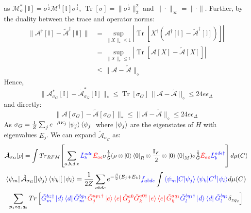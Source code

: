 \documentclass[aps,floatfix,10pt,amssymb,amsfont,amsmath,superscriptaddress,float,nofootinbib,longbibliography,nobalancelastpage,twocolumn]{revtex4-2}
\begin{document}
as $\mathcal{M}^*_{\sigma}[\mathbb{I}] = \sigma^{\frac{1}{2}}\mathcal{M}^{\dagger}[\mathbb{I}]\sigma^{\frac{1}{2}}$, $\operatorname{Tr}[\sigma] = \|\sigma^{\frac{1}{2}}\|_2^2$ and $\|\cdot\|_{\infty}= \|\cdot\|$. Further, by the duality between the trace and operator norms: 
\begin{align}
    \|\mathcal{A}^{\dagger}[\mathbb{I}]- \tilde{\mathcal{A}}^{\dagger}[\mathbb{I}]\| &= \sup_{\|X\|_* \leq 1} |\operatorname{Tr}[X^{\dagger}(\mathcal{A}^{\dagger}[\mathbb{I}]- \tilde{\mathcal{A}}^{\dagger}[\mathbb{I}]) ]|\\
    &= \sup_{\|X\|_* \leq 1}|\operatorname{Tr}[\mathcal{A}[X]- \tilde{\mathcal{A}}[X] ]|\\
    &\leq \|\mathcal{A}- \tilde{\mathcal{A}}\|_{\diamond}
\end{align}
Hence,
\begin{equation}
    \|\mathcal{A}^*_{\sigma_G}[\mathbb{I}] - \tilde{\mathcal{A}}^*_{\sigma_G}[\mathbb{I}]\|_* \leq \operatorname{Tr}[\sigma_G]\,\|\mathcal{A}- \tilde{\mathcal{A}}\|_{\diamond} \leq 24e\epsilon_{\Delta}
    \label{eq:AAtildeclose1}
\end{equation}
and directly:
\begin{equation}
    \|\mathcal{A}[\sigma_G] - \tilde{\mathcal{A}}[\sigma_G]\|_* \leq \|\mathcal{A}-\tilde{\mathcal{A}}\|_{\diamond} \leq 24e\epsilon_{\Delta}
    \label{eq:AAtildeclose2}
\end{equation}
As $\sigma_G = \frac{1}{Z}\sum_j e^{-\beta E_j} \ket{\psi_j}\bra{\psi_j}$ where $\ket{\psi_j}$ are the eigenstates of $H$ with eigenvalues $E_j$. We can expand $\tilde{\mathcal{A}}_{\sigma_G}$ as:
    \begin{equation}
    \tilde{\mathcal{A}}_{\sigma_G}[\rho] = \int Tr_{RFM}\!\left[\sum_{a,b,d,e}\textcolor{blue}{\tilde L^{ade}_b} \textcolor{red}{\tilde E_{ae}} \sigma_G^{\frac{1}{2}} (\rho\otimes \ket{0}\bra{0}_R \otimes \frac{\mathbb{I}_F}{2}\otimes \ket{0}\bra{0}_M) \sigma_G^{\frac{1}{2}}\textcolor{red}{\tilde E_{ae}}\textcolor{blue}{\tilde L^{ade\dagger}_b}\right] d\mu(C)
\end{equation}
\begin{multline}
    \bra{\psi_m}\tilde{\mathcal{A}}_{\sigma_G}[\ket{\psi_j}\bra{\psi_k}]\ket{\psi_l}=\frac{1}{2Z} \sum_{abde} e^{-\frac{\beta}{2}(E_j+E_k)}\textcolor{blue}{f_{abde}} \int \textcolor{blue}{\braket{\psi_m|C|\psi_j}\braket{\psi_k|C^{\dagger}|\psi_l}} d\mu(C)\\\sum_{p_1zq_1 q_2}Tr\left[\textcolor{blue}{\tilde G^{bz\dagger}_m\ket{d}\bra{d}\tilde G^{bp_1}_m} \textcolor{red}{\tilde G_j^{ap_1\dagger}\ket{e}\bra{e}\tilde G_j^{a0}\tilde G_k^{a0\dagger}\ket{e}\bra{e}\tilde G_k^{aq_1}} \textcolor{blue}{\tilde G^{bq_1\dagger}_l\ket{d}\bra{d}\tilde G^{bq_2}_l} \delta_{zq_2}\right]
    \label{eq:Arho}
\end{multline}
\end{document}
